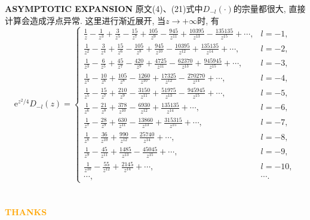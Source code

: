 \documentclass[aspectratio=169]{beamer}
\begin{document}
\begin{frame}{\textbf{{\LARGE{A}}SYMPTOTIC {\LARGE{E}}XPANSION}}
    原文(4)、(21)式中$D_{-l}(\cdot)$的宗量都很大, 直接计算会造成浮点异常. 这里进行渐近展开, 当$z\to+\infty$时, 有
    \begin{equation}
        \mathrm{e}^{z^2/4}D_{-l}(z) = \begin{cases}
        \frac{1}{z}-\frac{1}{z^3}+\frac{3}{z^5}-\frac{15}{z^7}+\frac{105}{z^9}-\frac{945}{z^{11}}+\frac{10395}{z^{13}}-\frac{135135}{z^{15}}+\cdots,&l=-1,\\
        \frac{1}{z^2}-\frac{3}{z^4}+\frac{15}{z^6}-\frac{105}{z^8}+\frac{945}{z^{10}}-\frac{10395}{z^{12}}+\frac{135135}{z^{14}}+\cdots,&l=-2,\\
        \frac{1}{z^3}-\frac{6}{z^5}+\frac{45}{z^7}-\frac{420}{z^9}+\frac{4725}{z^{11}}-\frac{62370}{z^{13}}+\frac{945945}{z^{15}}+\cdots,&l=-3,\\
        \frac{1}{z^4}-\frac{10}{z^6}+\frac{105}{z^8}-\frac{1260}{z^{10}}+\frac{17325}{z^{12}}-\frac{270270}{z^{14}}+\cdots,&l=-4,\\
        \frac{1}{z^5}-\frac{15}{z^7}+\frac{210}{z^9}-\frac{3150}{z^{11}}+\frac{51975}{z^{13}}-\frac{945945}{z^{15}}+\cdots,&l=-5,\\
        \frac{1}{z^6}-\frac{21}{z^8}+\frac{378}{z^{10}}-\frac{6930}{z^{12}}+\frac{135135}{z^{14}}+\cdots,&l=-6,\\
        \frac{1}{z^7}-\frac{28}{z^9}+\frac{630}{z^{11}}-\frac{13860}{z^{13}}+\frac{315315}{z^{15}}+\cdots,&l=-7,\\
        \frac{1}{z^8}-\frac{36}{z^{10}}+\frac{990}{z^{12}}-\frac{25740}{z^{14}}+\cdots,&l=-8,\\
        \frac{1}{z^9}-\frac{45}{z^{11}}+\frac{1485}{z^{13}}-\frac{45045}{z^{15}}+\cdots,&l=-9,\\
        \frac{1}{z^{10}}-\frac{55}{z^{12}}+\frac{2145}{z^{14}}+\cdots, &l=-10,\\
        \cdots, &\cdots.
        \end{cases}
    \end{equation}
\end{frame}

%




\section{}
\begin{frame}{}
\centering
\Huge\bfseries
\textcolor{orange}{THANKS}
\end{frame}
\end{document}

